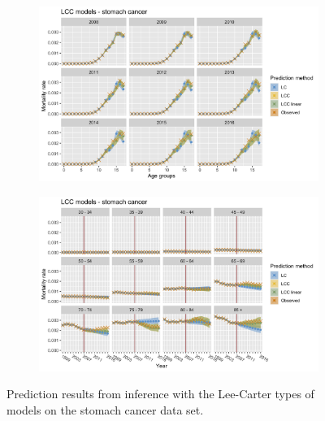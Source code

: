 \begin{figure}[h!]
    \centering
    \begin{subfigure}[b]{.45\linewidth}
        \includegraphics[width=\linewidth]{real-data/real-data-univariate/Figures/univariate-LCC-by-age-stomach.png}
    \end{subfigure}
    \begin{subfigure}[b]{.45\linewidth}
        \includegraphics[width=\linewidth]{real-data/real-data-univariate/Figures/univariate-LCC-by-period-stomach.png}
    \end{subfigure}
    \caption{Prediction results from inference with the Lee-Carter types of models on the stomach cancer data set.}
    \label{fig:uv-LCC-stomach}
\end{figure}

